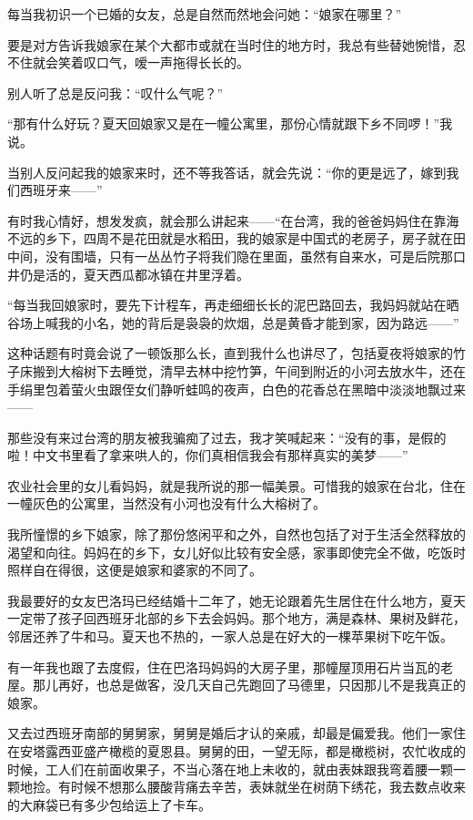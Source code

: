 \par 每当我初识一个已婚的女友，总是自然而然地会问她：“娘家在哪里？”
\par 要是对方告诉我娘家在某个大都市或就在当时住的地方时，我总有些替她惋惜，忍不住就会笑着叹口气，嗳一声拖得长长的。
\par 别人听了总是反问我：“叹什么气呢？”
\par “那有什么好玩？夏天回娘家又是在一幢公寓里，那份心情就跟下乡不同啰！”我说。
\par 当别人反问起我的娘家来时，还不等我答话，就会先说：“你的更是远了，嫁到我们西班牙来——”
\par 有时我心情好，想发发疯，就会那么讲起来——“在台湾，我的爸爸妈妈住在靠海不远的乡下，四周不是花田就是水稻田，我的娘家是中国式的老房子，房子就在田中间，没有围墙，只有一丛丛竹子将我们隐在里面，虽然有自来水，可是后院那口井仍是活的，夏天西瓜都冰镇在井里浮着。
\par “每当我回娘家时，要先下计程车，再走细细长长的泥巴路回去，我妈妈就站在晒谷场上喊我的小名，她的背后是袅袅的炊烟，总是黄昏才能到家，因为路远——”
\par 这种话题有时竟会说了一顿饭那么长，直到我什么也讲尽了，包括夏夜将娘家的竹子床搬到大榕树下去睡觉，清早去林中挖竹笋，午间到附近的小河去放水牛，还在手绢里包着萤火虫跟侄女们静听蛙鸣的夜声，白色的花香总在黑暗中淡淡地飘过来——
\par 那些没有来过台湾的朋友被我骗痴了过去，我才笑喊起来：“没有的事，是假的啦！中文书里看了拿来哄人的，你们真相信我会有那样真实的美梦——”
\par 农业社会里的女儿看妈妈，就是我所说的那一幅美景。可惜我的娘家在台北，住在一幢灰色的公寓里，当然没有小河也没有什么大榕树了。
\par 我所憧憬的乡下娘家，除了那份悠闲平和之外，自然也包括了对于生活全然释放的渴望和向往。妈妈在的乡下，女儿好似比较有安全感，家事即使完全不做，吃饭时照样自在得很，这便是娘家和婆家的不同了。
\par 我最要好的女友巴洛玛已经结婚十二年了，她无论跟着先生居住在什么地方，夏天一定带了孩子回西班牙北部的乡下去会妈妈。那个地方，满是森林、果树及鲜花，邻居还养了牛和马。夏天也不热的，一家人总是在好大的一棵苹果树下吃午饭。
\par 有一年我也跟了去度假，住在巴洛玛妈妈的大房子里，那幢屋顶用石片当瓦的老屋。那儿再好，也总是做客，没几天自己先跑回了马德里，只因那儿不是我真正的娘家。
\par 又去过西班牙南部的舅舅家，舅舅是婚后才认的亲戚，却最是偏爱我。他们一家住在安塔露西亚盛产橄榄的夏恩县。舅舅的田，一望无际，都是橄榄树，农忙收成的时候，工人们在前面收果子，不当心落在地上未收的，就由表妹跟我弯着腰一颗一颗地捡。有时候不想那么腰酸背痛去辛苦，表妹就坐在树荫下绣花，我去数点收来的大麻袋已有多少包给运上了卡车。
